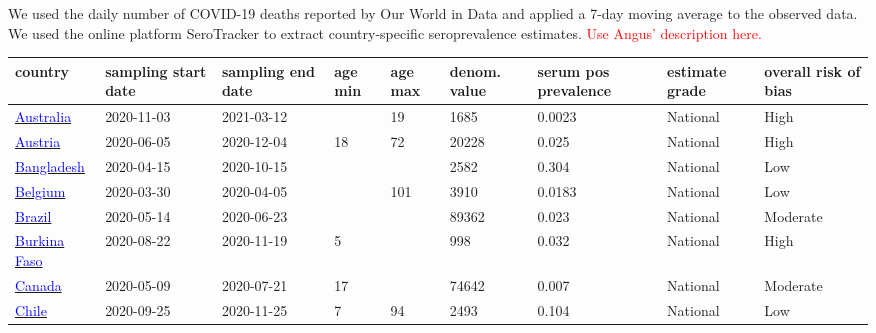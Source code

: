 We used the daily number of COVID-19 deaths reported by Our World in Data and applied a 7-day moving average to the observed data. 
We used the online platform SeroTracker to extract country-specific seroprevalence estimates.
\textcolor{red}{Use Angus' description here.}


\begin{table}[ht]  
    \footnotesize
    \begin{center}
        \begin{tabular}{p{2cm} | p{1.6cm} | p{1.6cm} | p{0.8cm} | p{0.8cm} | p{1cm} | p{1.3cm} | p{1.2cm} | p{1.2cm}}
           \hline            
           
           \textbf{country} & \textbf{sampling start date} & \textbf{sampling end date} & \textbf{age min} & \textbf{age max} & \textbf{denom. value} & \textbf{serum pos prevalence} & \textbf{estimate grade} & \textbf{overall risk of bias} \\ 
           \hline 
           \href{https://dx.doi.org/10.5694/mja2.51542}{\textcolor{blue}{Australia}} & 2020-11-03 & 2021-03-12 &  & 19 & 1685 & 0.0023 & National & High \\ 
           \hline 
           \href{https://dx.doi.org/10.1007/s15010-021-01639-0}{\textcolor{blue}{Austria}} & 2020-06-05 & 2020-12-04 & 18 & 72 & 20228 & 0.025 & National & High \\ 
           \hline 
           \href{https://www.ncbi.nlm.nih.gov/pmc/articles/PMC8809641/}{\textcolor{blue}{Bangladesh}} & 2020-04-15 & 2020-10-15 &  &  & 2582 & 0.304 & National & Low \\ 
           \hline 
           \href{https://dx.doi.org/10.2807/1560-7917.ES.2022.27.9.2100419}{\textcolor{blue}{Belgium}} & 2020-03-30 & 2020-04-05 &  & 101 & 3910 & 0.0183 & National & Low \\ 
           \hline 
           \href{https://www.ncbi.nlm.nih.gov/pmc/articles/PMC8225319/}{\textcolor{blue}{Brazil}} & 2020-05-14 & 2020-06-23 &  &  & 89362 & 0.023 & National & Moderate \\ 
           \hline 
           \href{https://dx.doi.org/10.3389/fpubh.2022.1048404}{\textcolor{blue}{Burkina Faso}} & 2020-08-22 & 2020-11-19 & 5 &  & 998 & 0.032 & National & High \\ 
           \hline 
           \href{http://dx.doi.org/10.1111/trf.16296}{\textcolor{blue}{Canada}} & 2020-05-09 & 2020-07-21 & 17 &  & 74642 & 0.007 & National & Moderate \\ 
           \hline 
           \href{https://dx.doi.org/10.1186/s12879-022-07045-7}{\textcolor{blue}{Chile}} & 2020-09-25 & 2020-11-25 & 7 & 94 & 2493 & 0.104 & National & Low \\ 

\end{tabular}
\end{center}
\end{table}

